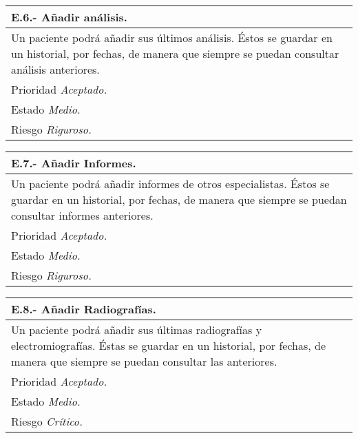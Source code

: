 \documentclass[a4paper,oneside,11pt]{book}
\begin{document}
\begin{center}
\begin{tabulary}{15cm}{|L|}
	\hline
		\bf{E.6.- Añadir análisis.} \\
	\hline
		Un paciente podrá añadir sus últimos análisis. Éstos se guardar en un historial, por fechas, de manera que siempre se puedan consultar análisis anteriores. \\
	\hline
		Prioridad \textit{Aceptado.} \\
	\hline
		Estado \textit{Medio.} \\
	\hline
		Riesgo \textit{Riguroso.} \\
	\hline
\end{tabulary}
\end{center}

\begin{center}
\begin{tabulary}{15cm}{|L|}
	\hline
		\bf{E.7.- Añadir Informes.} \\
	\hline
		Un paciente podrá añadir informes de otros especialistas. Éstos se guardar en un historial, por fechas, de manera que siempre se puedan consultar informes anteriores. \\
	\hline
		Prioridad \textit{Aceptado.} \\
	\hline
		Estado \textit{Medio.} \\
	\hline
		Riesgo \textit{Riguroso.} \\
	\hline
\end{tabulary}
\end{center}

\begin{center}
\begin{tabulary}{15cm}{|L|}
	\hline
		\bf{E.8.- Añadir Radiografías.} \\
	\hline
		Un paciente podrá añadir sus últimas radiografías y electromiografías. Éstas se guardar en un historial, por fechas, de manera que siempre se puedan consultar las anteriores. \\
	\hline
		Prioridad \textit{Aceptado.} \\
	\hline
		Estado \textit{Medio.} \\
	\hline
		Riesgo \textit{Crítico.} \\
	\hline
\end{tabulary}
\end{center}
\end{document}
